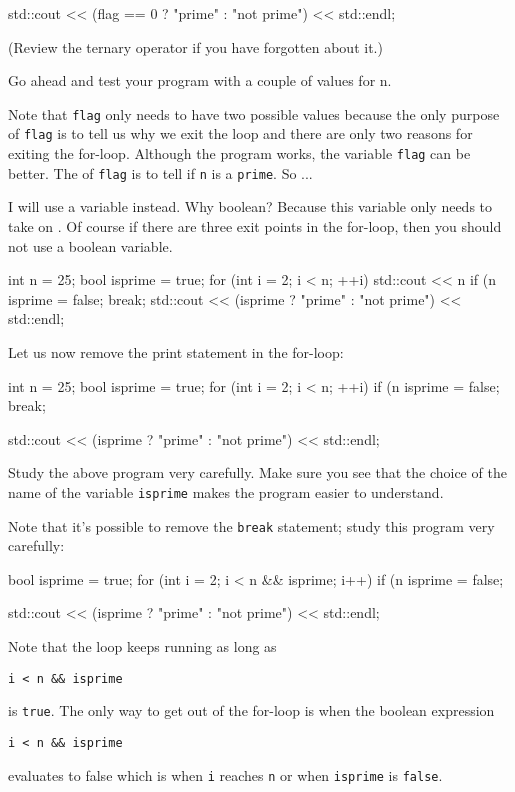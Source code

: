 \begin{console}
\begin{console}
std::cout << (flag == 0 ? "prime" : "not prime")
          << std::endl;
\end{console}
(Review the ternary operator if you have forgotten about it.)

Go ahead and test your program with a couple of values for n.

Note that \texttt{flag} only needs to have two possible values because the
only purpose of \texttt{flag} is to tell us why we exit the loop and there
are only two reasons for exiting the for-loop. Although the program
works, the variable  \texttt{flag} can be better. The
 of \texttt{flag} is to tell if \texttt{n} is a
\texttt{prime}. So ...

I will use a \texttt{} variable \texttt{}
instead. Why boolean? Because this variable only needs to take on
. Of course if there are three exit points
in the for-loop, then you should not use a boolean variable.
\begin{console}
int n = 25;
bool isprime = true;
for (int i = 2; i < n; ++i)
{   
    std::cout << n %
    if (n %
    {  
        isprime = false;
        break;
    }
}
std::cout << (isprime ? "prime" : "not prime") << std::endl;
\end{console}
Let us now remove the print statement in the for-loop:
\begin{console}
int n = 25;
bool isprime = true;
for (int i = 2; i < n; ++i)
{   
    if (n %
    {
        isprime = false;
        break;
    }
}

std::cout << (isprime ? "prime" : "not prime")
          << std::endl;
\end{console}
Study the above program very carefully. Make sure you see that the
choice of the name of the variable \texttt{isprime} makes the program
easier to understand.

Note that it's possible to remove the \texttt{break}
statement; study this program very carefully:
\begin{console}
bool isprime = true;
for (int i = 2; i < n && isprime; i++)
{   
    if (n %
    {
        isprime = false;
    }
}

std::cout << (isprime ? "prime" : "not prime")
          << std::endl;
\end{console}

Note that the loop keeps running as long as
\begin{center}
\texttt{i < n \&\& isprime}
\end{center}
is \texttt{true}. The only way to get out of the for-loop is when the
boolean expression
\begin{center}
\texttt{i < n \&\& isprime}
\end{center}
evaluates to false which is when \texttt{i} reaches \texttt{n} or when
\texttt{isprime} is \texttt{false}.


\end{console}
